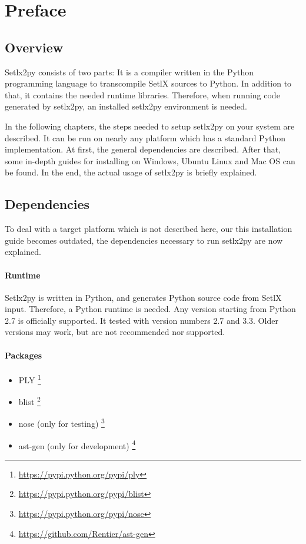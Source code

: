 \section{Preface}

\subsection{Overview}

Setlx2py consists of two parts: It is a compiler written in the Python programming language to transcompile SetlX sources to Python. In addition to that, it contains the needed runtime libraries. Therefore, when running code generated by setlx2py, an installed setlx2py environment is needed. 

In the following chapters, the steps needed to setup setlx2py on your system are described. It can be run on nearly any platform which has a standard Python implementation. At first, the general dependencies are described. After that, some in-depth guides for installing on Windows, Ubuntu Linux and Mac OS can be found. In the end, the actual usage of setlx2py is briefly explained.

\subsection{Dependencies}

To deal with a target platform which is not described here, our this installation guide becomes outdated, the dependencies necessary to run setlx2py are now explained.

\paragraph{Runtime}

Setlx2py is written in Python, and generates Python source code from SetlX input. Therefore, a Python runtime is needed. Any version starting from Python 2.7 is officially supported. It tested with version numbers 2.7 and 3.3. Older versions may work, but are not recommended nor supported.

\paragraph{Packages}

\begin{itemize}
\item PLY \footnote{\url{https://pypi.python.org/pypi/ply}}
\item blist \footnote{\url{https://pypi.python.org/pypi/blist}}
\item nose (only for testing) \footnote{\url{https://pypi.python.org/pypi/nose}}
\item ast-gen (only for development) \footnote{\url{https://github.com/Rentier/ast-gen}}
\end{itemize}